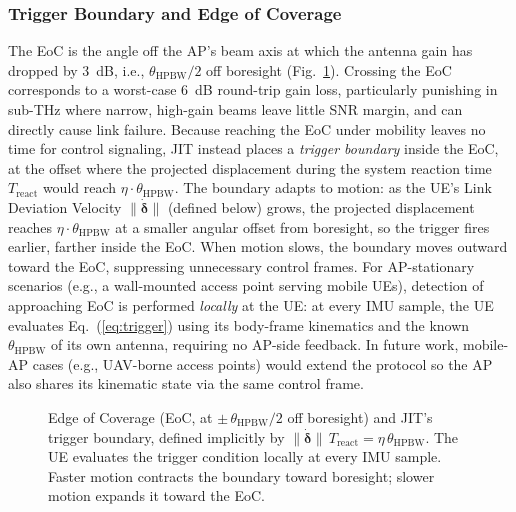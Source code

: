 \documentclass[fleqn,10pt]{wlscirep}
\newcommand{\rev}[1]{#1}
\begin{document}
\rev{\subsubsection*{Trigger Boundary and Edge of Coverage}
The EoC is the angle off the AP's beam axis at which the antenna gain has dropped by \SI{3}{\deci\bel}, i.e., $\theta_{\text{HPBW}}/2$ off boresight (Fig.~\ref{fig:eoc_trigger}). Crossing the EoC corresponds to a worst-case \SI{6}{\deci\bel} round-trip gain loss, particularly punishing in sub-THz where narrow, high-gain beams leave little SNR margin, and can directly cause link failure. Because reaching the EoC under mobility leaves no time for control signaling, JIT instead places a \emph{trigger boundary} inside the EoC, at the offset where the projected displacement during the system reaction time $T_{\text{react}}$ would reach $\eta \cdot \theta_{\text{HPBW}}$. The boundary adapts to motion: as the UE's Link Deviation Velocity $\|\dot{\boldsymbol{\delta}}\|$ (defined below) grows, the projected displacement reaches $\eta \cdot \theta_{\text{HPBW}}$ at a smaller angular offset from boresight, so the trigger fires earlier, farther inside the EoC. When motion slows, the boundary moves outward toward the EoC, suppressing unnecessary control frames. For AP-stationary scenarios (e.g., a wall-mounted access point serving mobile UEs), detection of approaching EoC is performed \emph{locally} at the UE: at every IMU sample, the UE evaluates Eq.~(\ref{eq:trigger}) using its body-frame kinematics and the known $\theta_{\text{HPBW}}$ of its own antenna, requiring no AP-side feedback. In future work, mobile-AP cases (e.g., UAV-borne access points) would extend the protocol so the AP also shares its kinematic state via the same control frame.}

\begin{figure}[h!]
\centering
\resizebox{0.85\linewidth}{!}{}
\caption{\rev{Edge of Coverage (EoC, at $\pm\,\theta_{\text{HPBW}}/2$ off boresight) and JIT's trigger boundary, defined implicitly by $\|\dot{\boldsymbol{\delta}}\|\,T_{\text{react}} = \eta\,\theta_{\text{HPBW}}$. The UE evaluates the trigger condition locally at every IMU sample. Faster motion contracts the boundary toward boresight; slower motion expands it toward the EoC.}}
\label{fig:eoc_trigger}
\vspace{-5pt}
\end{figure}
\end{document}
